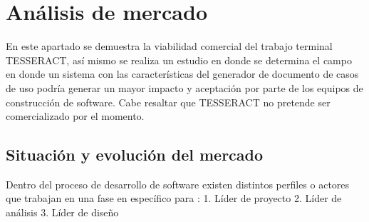 \chapter{Análisis de mercado}

En este apartado se demuestra la viabilidad comercial del trabajo terminal TESSERACT, así mismo se realiza un estudio en donde se determina el campo en donde un sistema con las características del generador de documento de casos de uso podría generar un mayor impacto y aceptación por parte de los equipos de construcción de software. Cabe resaltar que TESSERACT no pretende ser comercializado por el momento.


\section{Situación  y evolución del mercado}

Dentro del proceso de desarrollo de software existen distintos perfiles o actores que trabajan en una fase en específico para :
1. Líder de proyecto
2. Líder de análisis
3. Líder de diseño
